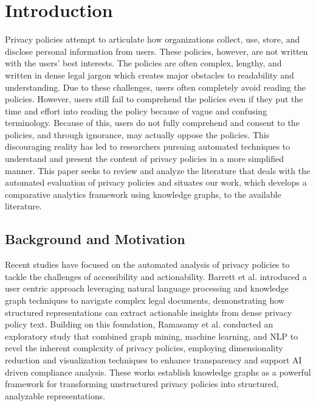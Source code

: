\documentclass[conference]{IEEEtran}
\begin{document}
\section{Introduction}
Privacy policies attempt to articulate how organizations collect, use, store, and disclose personal information from users. These policies, however, are not written with the users' best interests. The policies are often complex, lengthy, and written in dense legal jargon which creates major obstacles to readability and understanding. Due to these challenges, users often completely avoid reading the policies. However, users still fail  to comprehend the policies even if they put the time and effort into reading the policy because of vague and confusing terminology. Because of this, users do not fully comprehend and consent to the policies, and through ignorance, may actually oppose the policies. This discouraging reality has led to researchers pursuing automated techniques to understand and present the content of privacy policies in a more simplified manner. This paper seeks to review and analyze the literature that deals with the automated evaluation of privacy policies and situates our work, which develops a comparative analytics framework using knowledge graphs, to the available literature.



\subsection{Background and Motivation}
Recent studies have focused on the automated analysis of privacy policies to tackle the challenges of accessibility and actionability. Barrett et al. \cite{barrett2025} introduced a user centric approach leveraging natural language processing and knowledge graph techniques to navigate complex legal documents, demonstrating how structured representations can extract actionable insights from dense privacy policy text. Building on this foundation, Ramasamy et al. \cite{ramasamy2025} conducted an exploratory study that combined graph mining, machine learning, and NLP to revel the inherent complexity of privacy policies, employing dimensionality reduction and visualization techniques to enhance transparency and support AI driven compliance analysis. These works establish knowledge graphs as a powerful framework for transforming unstructured privacy policies into structured, analyzable representations.
\end{document}
